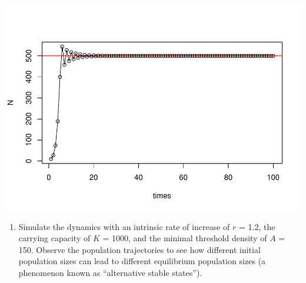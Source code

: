 \documentclass[
]{book}
\providecommand{\tightlist}{%
  \setlength{\itemsep}{0pt}\setlength{\parskip}{0pt}}
\begin{document}
\includegraphics{bookdown-demo_files/figure-latex/unnamed-chunk-14-1.pdf}

\begin{enumerate}
\def\labelenumi{(\arabic{enumi})}
\setcounter{enumi}{1}
\tightlist
\item
  Simulate the dynamics with an intrinsic rate of increase of \(r\) = 1.2, the carrying capacity of \(K\) = 1000, and the minimal threshold density of \(A\) = 150. Observe the population trajectories to see how different initial population sizes can lead to different equilibrium population sizes (a phenomenon known as ``alternative stable states'').
\end{enumerate}
\end{document}
